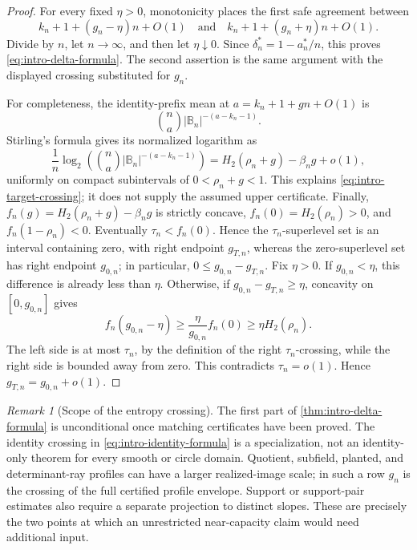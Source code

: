 \documentclass[11pt,a4paper]{amsart}
\numberwithin{equation}{section}
\theoremstyle{remark}
\newtheorem{remark}[remark]{Remark}
\newcommand{\B}{\mathbb B}
\begin{document}
\begin{proof}
For every fixed \(\eta>0\), monotonicity places the first safe agreement
between
\[
 k_n+1+(g_n-\eta)n+O(1)
 \quad\text{and}\quad
 k_n+1+(g_n+\eta)n+O(1).
\]
Divide by \(n\), let \(n\to\infty\), and then let \(\eta\downarrow0\).
Since \(\delta_n^*=1-a_n^*/n\), this proves
\eqref{eq:intro-delta-formula}.  The second assertion is the same
argument with the displayed crossing substituted for \(g_n\).

For completeness, the identity-prefix mean at
\(a=k_n+1+gn+O(1)\) is
\[
 \binom na|\B_n|^{-(a-k_n-1)}.
\]
Stirling's formula gives its normalized logarithm as
\[
 \frac1n\log_2\!\left(
 \binom na|\B_n|^{-(a-k_n-1)}\right)
 =H_2(\rho_n+g)-\beta_ng+o(1),
\]
uniformly on compact subintervals of \(0<\rho_n+g<1\).  This explains
\eqref{eq:intro-target-crossing}; it does not supply the assumed upper
certificate.  Finally,
\(f_n(g)=H_2(\rho_n+g)-\beta_ng\) is strictly concave,
\(f_n(0)=H_2(\rho_n)>0\), and \(f_n(1-\rho_n)<0\).  Eventually
\(\tau_n<f_n(0)\).  Hence the \(\tau_n\)-superlevel set is an interval
containing zero, with right endpoint \(g_{T,n}\), whereas the
zero-superlevel set has right endpoint \(g_{0,n}\); in particular,
\(0\le g_{0,n}-g_{T,n}\).  Fix \(\eta>0\).  If \(g_{0,n}<\eta\), this
difference is already less than \(\eta\).  Otherwise, if
\(g_{0,n}-g_{T,n}\ge\eta\), concavity on \([0,g_{0,n}]\) gives
\[
 f_n(g_{0,n}-\eta)
 \ge \frac{\eta}{g_{0,n}}f_n(0)
 \ge \eta H_2(\rho_n).
\]
The left side is at most \(\tau_n\), by the definition of the right
\(\tau_n\)-crossing, while the right side is bounded away from zero.
This contradicts \(\tau_n=o(1)\).  Hence
\(g_{T,n}=g_{0,n}+o(1)\).
\end{proof}

\begin{remark}[Scope of the entropy crossing]\label{rem:intro-delta-scope}
The first part of \cref{thm:intro-delta-formula} is unconditional once
matching certificates have been proved.  The identity crossing in
\eqref{eq:intro-identity-formula} is a specialization, not an
identity-only theorem for every smooth or circle domain.  Quotient,
subfield, planted, and determinant-ray profiles can have a larger
realized-image scale; in such a row \(g_n\) is the crossing of the full
certified profile envelope.  Support or support-pair estimates also require
a separate projection to distinct slopes.  These are precisely the two
points at which an unrestricted near-capacity claim would need additional
input.
\end{remark}
\end{document}
